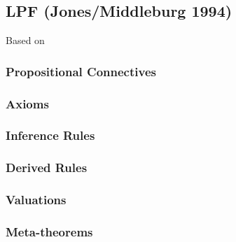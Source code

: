 \subsection{\textbf{LPF} (Jones/Middleburg 1994)}
Based on \cite{JM94}



\subsubsection{Propositional Connectives}


\subsubsection{Axioms}


\subsubsection{Inference Rules}


\subsubsection{Derived Rules}


\subsubsection{Valuations}


\subsubsection{Meta-theorems}


